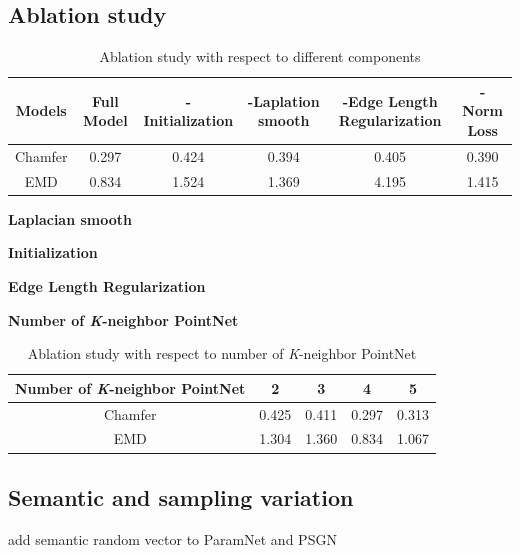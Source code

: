 \subsection{Ablation study}
\begin{table}
	\caption{Ablation study with respect to different components}
	\label{tab:ablation}
	\centering
	\begin{tabular}{c | c c c c c}
		Models &  Full Model  & -Initialization & -Laplation smooth & -Edge Length Regularization & -Norm Loss \\
		\hline
		Chamfer      & 0.297 & 0.424 & 0.394 & 0.405  & 0.390\\
		EMD			 & 0.834 & 1.524 & 1.369 & 4.195  & 1.415
	\end{tabular}
\end{table}
\noindent\textbf{Laplacian smooth}

\noindent\textbf{Initialization}

\noindent\textbf{Edge Length Regularization}

\noindent\textbf{Number of \textit{K}-neighbor PointNet}
\begin{table}
	\caption{Ablation study with respect to number of \textit{K}-neighbor PointNet}
	\label{tab:pointnet}
	\centering
	\begin{tabular}{c | c c c c}
		Number of \textit{K}-neighbor PointNet &  2 & 3 & 4 & 5 \\
		\hline
		Chamfer      & 0.425 &  0.411 & 0.297 & 0.313 \\
		EMD			 & 1.304 &  1.360 & 0.834 & 1.067
	\end{tabular}
\end{table}
\subsection{Semantic and sampling variation}
add semantic random vector to ParamNet and PSGN\cite{PSGN}